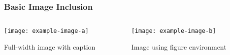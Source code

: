 \documentclass[aspectratio=169,professionalfonts]{beamer}
\begin{document}
\begin{frame}
    \frametitle{Basic Image Inclusion}
    
    \begin{columns}[T]
        \begin{column}{0.48\textwidth}
            \texttt{[image: example-image-a]}
            \centerline{\small Full-width image with caption}
            
            \vspace{1em}
            
        \end{column}
        
        \begin{column}{0.48\textwidth}
            \begin{figure}
                \texttt{[image: example-image-b]}
                \caption{Image using figure environment}
            \end{figure}
            
        \end{column}
    \end{columns}
\end{frame}
\end{document}
